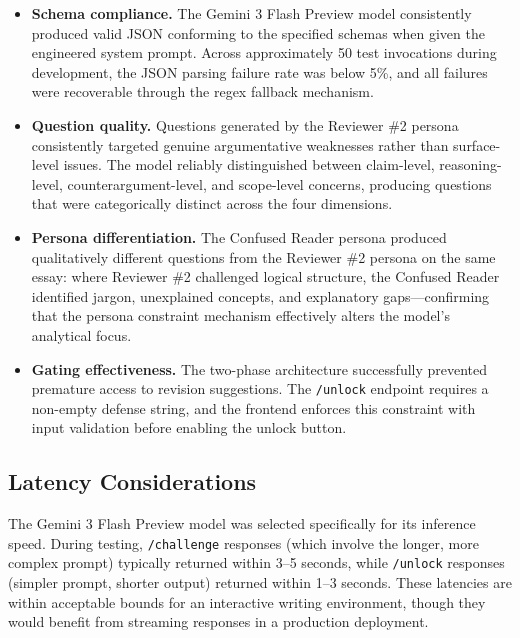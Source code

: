 \documentclass[11pt,a4paper]{article}
\begin{document}
\begin{itemize}[leftmargin=*]
    \item \textbf{Schema compliance.} The Gemini 3 Flash Preview model consistently produced valid JSON conforming to the specified schemas when given the engineered system prompt. Across approximately 50 test invocations during development, the JSON parsing failure rate was below 5\%, and all failures were recoverable through the regex fallback mechanism.

    \item \textbf{Question quality.} Questions generated by the Reviewer \#2 persona consistently targeted genuine argumentative weaknesses rather than surface-level issues. The model reliably distinguished between claim-level, reasoning-level, counterargument-level, and scope-level concerns, producing questions that were categorically distinct across the four dimensions.

    \item \textbf{Persona differentiation.} The Confused Reader persona produced qualitatively different questions from the Reviewer \#2 persona on the same essay: where Reviewer \#2 challenged logical structure, the Confused Reader identified jargon, unexplained concepts, and explanatory gaps---confirming that the persona constraint mechanism effectively alters the model's analytical focus.

    \item \textbf{Gating effectiveness.} The two-phase architecture successfully prevented premature access to revision suggestions. The \texttt{/unlock} endpoint requires a non-empty defense string, and the frontend enforces this constraint with input validation before enabling the unlock button.
\end{itemize}

\subsection{Latency Considerations}

The Gemini 3 Flash Preview model was selected specifically for its inference speed. During testing, \texttt{/challenge} responses (which involve the longer, more complex prompt) typically returned within 3--5 seconds, while \texttt{/unlock} responses (simpler prompt, shorter output) returned within 1--3 seconds. These latencies are within acceptable bounds for an interactive writing environment, though they would benefit from streaming responses in a production deployment.
\end{document}
